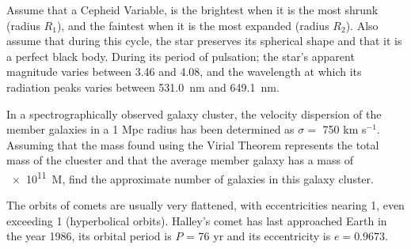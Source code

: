 \documentclass[11pt, a4paper]{exam}
\begin{document}
	\begin{questions}
		\question
		Assume that a Cepheid Variable, is the brightest when it is the most shrunk (radius $R_1$), and the faintest when it is the most expanded (radius $R_2$). Also assume that during this cycle, the star preserves its spherical shape and that it is a perfect black body. During its period of pulsation; the star's apparent magnitude varies between 3.46 and 4.08, and the wavelength at which its radiation peaks varies between \SI{531.0}{nm} and \SI{649.1}{nm}.
		
		\question
		In a spectrographically observed galaxy cluster, the velocity dispersion of the member galaxies in a 1 Mpc radius has been determined as $\sigma =$ 750 km s$^{-1}$. Assuming that the mass found using the Virial Theorem represents the total mass of the cluester and that the average member galaxy has a mass of  \SI{e11}{M_\odot}, find the approximate number of galaxies in this galaxy cluster.
		
		\question
		The orbits of comets are usually very flattened, with eccentricities nearing 1, even exceeding 1 (hyperbolical orbits). Halley's comet has last approached Earth in the year 1986, its orbital period is $P$  = 76 yr and its eccentricity is $e = 0.9673$.
\end{questions}
\end{document}
